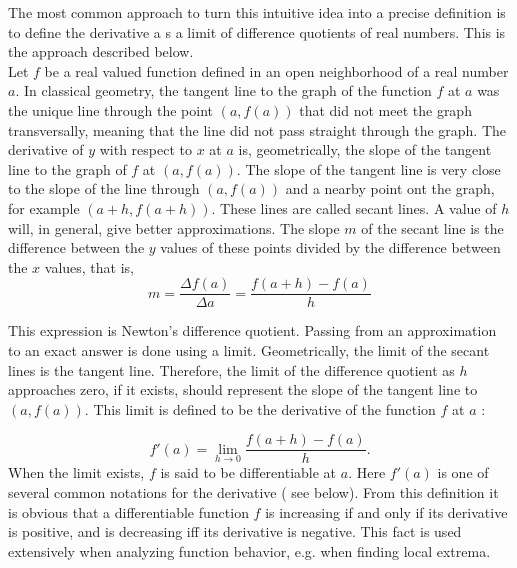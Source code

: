 The most common approach to turn this intuitive idea into a precise definition is to define the derivative a s a limit of difference quotients of real numbers. This is the approach described below.\\
Let $f$ be a real valued function defined in an open neighborhood of a real number $a$. In classical geometry, the tangent line to the graph of the function $f$ at $a$ was the unique line through the point $(a,f(a))$ that did not meet the graph transversally, meaning that the line did not pass straight through the graph. The derivative of $y$ with respect to $x$ at $a$ is, geometrically, the slope of the tangent line to the graph of $f$ at $(a,f(a))$.
The slope of the tangent line is very close to the slope of the line through $(a,f(a))$ and a nearby point ont the graph, for example $(a+h,f(a+h))$. These lines are called secant lines. A value of $h$ will, in general, give better approximations. The slope $m$ of the secant line is the difference between the $y$ values of these points divided by the difference between the $x$ values, that is,
\[ 
	m = \frac{\Delta f(a)}{\Delta a} = \frac{f(a+h) - f(a)}{h}
\]

This expression is Newton's difference quotient. Passing from an approximation to an exact answer is done using a limit. Geometrically, the limit of the secant lines is the tangent line. Therefore, the limit of the difference quotient as $h$ approaches zero, if it exists, should represent the slope of the tangent line to $(a,f(a))$. This limit is defined to be the derivative of the function $f$ at $a$ :

\[ 
	f'(a) = \lim_{h \to 0} \frac{f(a+h) -f(a)}{h}.
\]
When the limit exists, $f$ is said to be differentiable at $a$. Here $f'(a)$ is one of several common notations for the derivative ( see below). From this definition it is obvious that a differentiable function $f$ is increasing if and only if its derivative is positive, and is decreasing iff its derivative is negative.
This fact is used extensively when analyzing function behavior, e.g. when finding local extrema.

